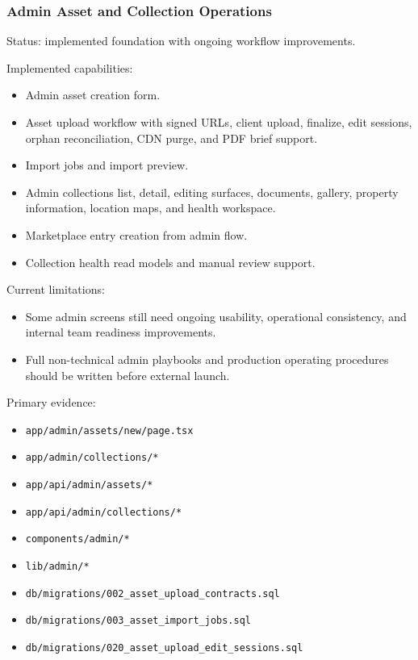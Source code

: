 \documentclass[
  10pt,
  letterpaper,
]{article}
\providecommand{\tightlist}{%
  \setlength{\itemsep}{0pt}\setlength{\parskip}{0pt}}
\let\oldtexttt\texttt
\renewcommand{\texttt}[1]{\oldtexttt{\small #1}}
\begin{document}
\subsubsection{Admin Asset and Collection
Operations}\label{admin-asset-and-collection-operations}

Status: implemented foundation with ongoing workflow improvements.

Implemented capabilities:

\begin{itemize}
\tightlist
\item
  Admin asset creation form.
\item
  Asset upload workflow with signed URLs, client upload, finalize, edit
  sessions, orphan reconciliation, CDN purge, and PDF brief support.
\item
  Import jobs and import preview.
\item
  Admin collections list, detail, editing surfaces, documents, gallery,
  property information, location maps, and health workspace.
\item
  Marketplace entry creation from admin flow.
\item
  Collection health read models and manual review support.
\end{itemize}

Current limitations:

\begin{itemize}
\tightlist
\item
  Some admin screens still need ongoing usability, operational
  consistency, and internal team readiness improvements.
\item
  Full non-technical admin playbooks and production operating procedures
  should be written before external launch.
\end{itemize}

Primary evidence:

\begin{itemize}
\tightlist
\item
  \texttt{app/admin/assets/new/page.tsx}
\item
  \texttt{app/admin/collections/*}
\item
  \texttt{app/api/admin/assets/*}
\item
  \texttt{app/api/admin/collections/*}
\item
  \texttt{components/admin/*}
\item
  \texttt{lib/admin/*}
\item
  \texttt{db/migrations/002\_asset\_upload\_contracts.sql}
\item
  \texttt{db/migrations/003\_asset\_import\_jobs.sql}
\item
  \texttt{db/migrations/020\_asset\_upload\_edit\_sessions.sql}
\end{itemize}
\end{document}
